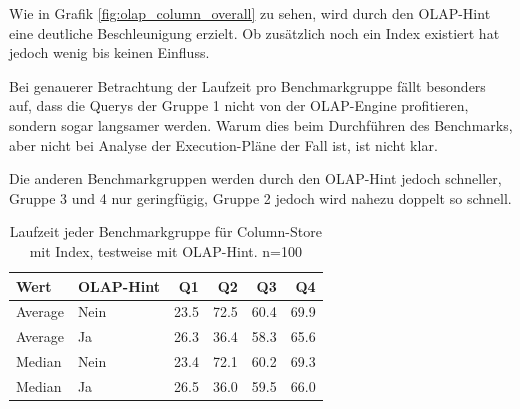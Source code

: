 Wie in Grafik \ref{fig:olap_column_overall} zu sehen, wird durch den OLAP-Hint eine deutliche Beschleunigung erzielt. Ob zusätzlich noch ein Index existiert hat jedoch wenig bis keinen Einfluss.

Bei genauerer Betrachtung der Laufzeit pro Benchmarkgruppe fällt besonders auf, dass die Querys der Gruppe 1 nicht von der OLAP-Engine profitieren, sondern sogar langsamer werden. 
Warum dies beim Durchführen des Benchmarks, aber nicht bei Analyse der Execution-Pläne der Fall ist, ist nicht klar.

\begin{figure}[H] 
\end{figure}

Die anderen Benchmarkgruppen werden durch den OLAP-Hint jedoch schneller, Gruppe 3 und 4 nur geringfügig, Gruppe 2 jedoch wird nahezu doppelt so schnell.
\begin{table}[H]
    \centering
    \begin{tabularx}{\textwidth}{lXrrrr}
    \toprule
	Wert        &	OLAP-Hint & Q1 	    &	Q2 	    &	Q3	    &	Q4 \\
    \toprule
    Average	    & Nein        &	23.5	&	72.5	&	60.4	&	69.9 \\
    Average     & Ja	      &	26.3	&	36.4	&	58.3	&	65.6 \\
    \midrule
    Median	    & Nein        &	23.4	&	72.1	&	60.2	&	69.3 \\
    Median	    & Ja          &	26.5	&	36.0	&	59.5	&	66.0 \\
    \bottomrule
    \end{tabularx}
	\caption{Laufzeit jeder Benchmarkgruppe für Column-Store mit Index, testweise mit OLAP-Hint. n=100}
    \label{tab:olap_bench}
\end{table}

